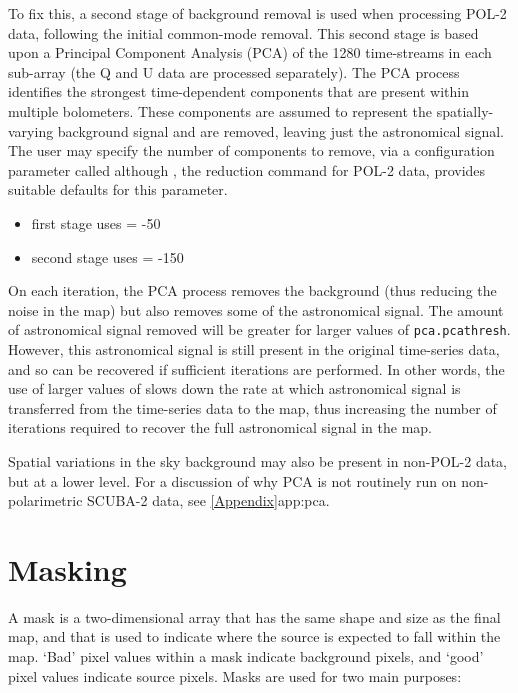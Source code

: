 To fix this, a second stage of background removal is used when processing
POL-2 data, following the initial common-mode removal. This second stage
is based upon a Principal Component Analysis (PCA) of the 1280
time-streams in each sub-array (the Q and U data are processed
separately). The PCA process identifies the strongest time-dependent
components that are present within multiple bolometers. These components
are assumed to represent the spatially-varying background signal and are
removed, leaving just the astronomical signal. The user may specify the number
of components to remove, via a  configuration
parameter called  although \poltwomap,
the reduction command for POL-2 data, provides suitable defaults for this parameter.

\begin{itemize}
\item first stage uses  = -50
\item second stage uses  = -150
\end{itemize}

On each  iteration, the PCA process removes the background (thus
reducing the noise in the map) but also removes some of the astronomical
signal. The amount of astronomical signal removed will be greater for
larger values of \texttt{pca.pcathresh}. However, this astronomical
signal is still present in the original time-series data, and so can be
recovered if sufficient  iterations are performed. In other words,
the use of larger values of  slows down the rate at
which astronomical signal is transferred from the time-series data to the
map, thus increasing the number of iterations required to recover the
full astronomical signal in the map.

Spatial variations in the sky background may also be present in non-POL-2
data, but at a lower level. For a discussion of why PCA is not routinely
run on non-polarimetric SCUBA-2 data, see \cref{Appendix}{app:pca}{}.



\section{Masking}
A mask is a two-dimensional array that has the same shape and size as
the final map, and that is used to indicate where the source is
expected to fall within the map. `Bad' pixel values within a mask
indicate background pixels, and `good' pixel values indicate source
pixels. Masks are used for two main purposes:

